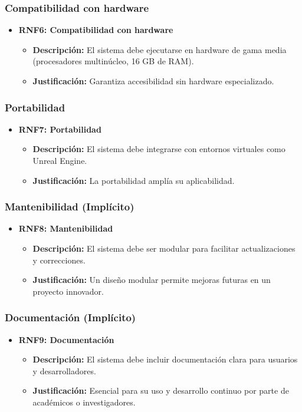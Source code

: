 \subsubsection{Compatibilidad con hardware}
\begin{itemize}
    \item \textbf{RNF6: Compatibilidad con hardware}
    \begin{itemize}
        \item \textbf{Descripción:} El sistema debe ejecutarse en hardware de gama media (procesadores multinúcleo, 16 GB de RAM).
        \item \textbf{Justificación:} Garantiza accesibilidad sin hardware especializado.
    \end{itemize}
\end{itemize}

\subsubsection{Portabilidad}
\begin{itemize}
    \item \textbf{RNF7: Portabilidad}
    \begin{itemize}
        \item \textbf{Descripción:} El sistema debe integrarse con entornos virtuales como Unreal Engine.
        \item \textbf{Justificación:} La portabilidad amplía su aplicabilidad.
    \end{itemize}
\end{itemize}

\subsubsection{Mantenibilidad (Implícito)}
\begin{itemize}
    \item \textbf{RNF8: Mantenibilidad}
    \begin{itemize}
        \item \textbf{Descripción:} El sistema debe ser modular para facilitar actualizaciones y correcciones.
        \item \textbf{Justificación:} Un diseño modular permite mejoras futuras en un proyecto innovador.
    \end{itemize}
\end{itemize}

\subsubsection{Documentación (Implícito)}
\begin{itemize}
    \item \textbf{RNF9: Documentación}
    \begin{itemize}
        \item \textbf{Descripción:} El sistema debe incluir documentación clara para usuarios y desarrolladores.
        \item \textbf{Justificación:} Esencial para su uso y desarrollo continuo por parte de académicos o investigadores.
    \end{itemize}
\end{itemize}